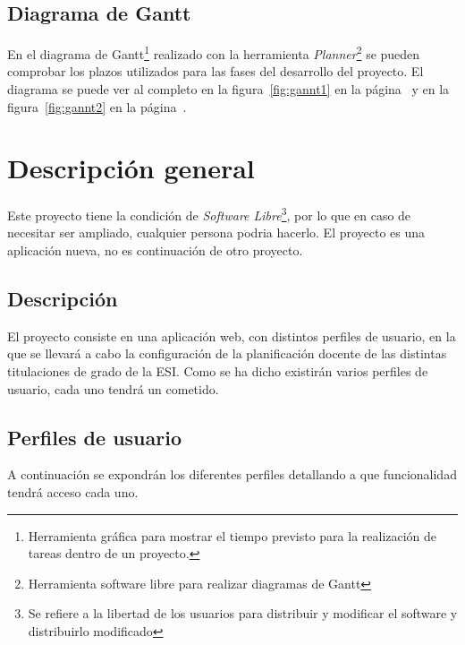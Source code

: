 \documentclass[a4paper,11pt]{article} %
\begin{document}
\subsection{Diagrama de Gantt}
En el diagrama de Gantt\footnote{Herramienta gráfica para mostrar el tiempo previsto para la realización de tareas dentro de un proyecto.} realizado con la herramienta {\em Planner}\footnote{Herramienta software libre para realizar diagramas de Gantt} se pueden comprobar los plazos utilizados para las fases del desarrollo del proyecto. El diagrama se puede ver al completo en la figura~\ref{fig:gannt1} en la página~\pageref{fig:gannt1} y en la figura~\ref{fig:gannt2} en la página~\pageref{fig:gannt2}.
\section{Descripción general}

\paragraph{}
Este proyecto tiene la condición de {\em Software Libre}\footnote{Se refiere a la libertad de los usuarios para distribuir y modificar el software y distribuirlo modificado}, por lo que en caso de necesitar ser ampliado, cualquier persona podria hacerlo. El proyecto es una aplicación nueva, no es continuación de otro proyecto.

\subsection{Descripción}

El proyecto consiste en una aplicación web, con distintos perfiles de usuario, en la que se llevará a cabo la configuración de la planificación docente de las distintas titulaciones de grado de la ESI. Como se ha dicho existirán varios perfiles de usuario, cada uno tendrá un cometido.

\subsection{Perfiles de usuario}

A continuación se expondrán los diferentes perfiles detallando a que funcionalidad tendrá acceso cada uno.
\end{document}
